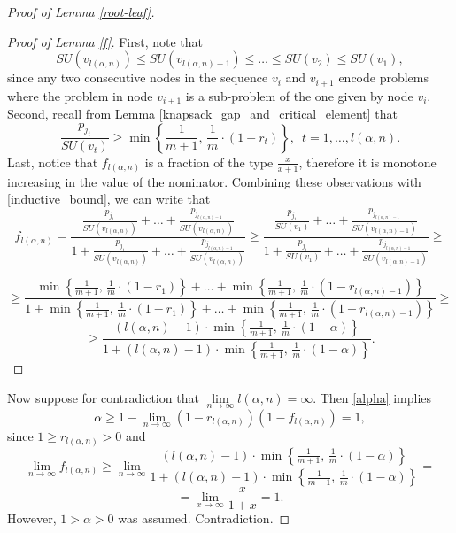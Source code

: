 \documentclass[a4paper,UKenglish,cleveref, autoref, thm-restate, pdfa]{lipics-v2021}
\theoremstyle{plain}
\begin{document}
\begin{proof}[Proof of Lemma \ref{root-leaf}]
    \begin{proof}[Proof of Lemma \ref{f}]
        First, note that
        \[
        SU(v_{l(\alpha, n)}) \le SU(v_{l(\alpha, n)-1}) \le \ldots \le SU(v_2) \le SU(v_1),
        \]
        since any two consecutive nodes in the sequence $v_i$ and $v_{i+1}$ encode problems where the problem in node $v_{i+1}$ is a sub-problem of the one given by node $v_i$. Second, recall from Lemma \ref{knapsack_gap_and_critical_element} that 
        \[
        \frac{p_{j_t}}{SU(v_t)} \ge \min\left\{\frac{1}{m+1}, \,\frac{1}{m}\cdot (1-r_t) \right\}, \,\,\, t = 1, \ldots, l(\alpha, n).
        \]
        Last, notice that $f_{l(\alpha, n)}$ is a fraction of the type $\frac{x}{x+1}$, therefore it is monotone increasing in the value of the nominator. Combining these observations with \eqref{inductive_bound}, we can write that
        \[
        f_{l(\alpha, n)} = \frac{\frac{p_{j_1}}{SU(v_{l(\alpha, n)})} + \ldots + \frac{p_{j_{l(\alpha, n)-1}}}{SU(v_{l(\alpha, n)})}}
        {1 + \frac{p_{j_1}}{SU(v_{l(\alpha, n)})} + \ldots + \frac{p_{j_{l(\alpha, n)-1}}}{SU(v_{l(\alpha, n)})}} \ge 
        \frac{\frac{p_{j_1}}{SU(v_1)} + \ldots + \frac{p_{j_{l(\alpha, n)-1}}}{SU(v_{l(\alpha, n)-1})}}
        {1 + \frac{p_{j_1}}{SU(v_1)} + \ldots + \frac{p_{j_{l(\alpha, n)-1}}}{SU(v_{l(\alpha, n)-1})}} \ge
        \]

        \[
        \ge \frac{\min\left\{\frac{1}{m+1}, \, \frac{1}{m}\cdot (1-r_1)\right\} + \ldots + \min\left\{\frac{1}{m+1}, \, \frac{1}{m}\cdot (1-r_{l(\alpha,n)-1})\right\}}{1+\min\left\{\frac{1}{m+1}, \, \frac{1}{m}\cdot (1-r_1)\right\} + \ldots + \min\left\{\frac{1}{m+1}, \, \frac{1}{m}\cdot (1-r_{l(\alpha,n)-1})\right\}} \ge 
        \]
        \[
        \ge \frac{(l(\alpha, n) -1)\cdot \min\left\{\frac{1}{m+1},\, \frac{1}{m} \cdot (1-\alpha)\right\}}{1+(l(\alpha, n) -1)\cdot \min\left\{\frac{1}{m+1},\, \frac{1}{m} \cdot (1-\alpha)\right\}}.
        \]
    \end{proof}

    Now suppose for contradiction that $\lim\limits_{n \to \infty} l(\alpha,n) = \infty$. Then \eqref{alpha} implies
    \[
    \alpha \ge 1- \lim\limits_{n \to \infty} (1-r_{l(\alpha,n)})(1-f_{l(\alpha, n)}) = 1,
    \]
    since $1 \ge r_{l(\alpha, n)} > 0$ and 
    \[
    \lim\limits_{n \to \infty} f_{l(\alpha, n)} \ge \lim\limits_{n \to \infty} \frac{(l(\alpha, n) -1)\cdot \min\left\{\frac{1}{m+1},\, \frac{1}{m} \cdot (1-\alpha)\right\}}{1+(l(\alpha, n) -1)\cdot \min\left\{\frac{1}{m+1},\, \frac{1}{m} \cdot (1-\alpha)\right\}} = 
    \]
    \[
    =\lim\limits_{x \to \infty} \frac{x}{1+x}=1.
    \]
    However, $1 > \alpha >0$ was assumed. Contradiction.
\end{proof}
\end{document}
